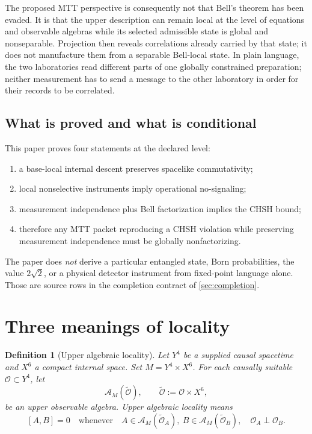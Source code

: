 \documentclass[11pt]{article}
\newcommand{\cA}{\mathcal{A}}
\newtheorem{definition}[theorem]{Definition}
\theoremstyle{remark}
\begin{document}
The proposed MTT perspective is consequently not that Bell's theorem has been
evaded.  It is that the upper description can remain local at the level of
equations and observable algebras while its selected admissible state is
global and nonseparable.  Projection then reveals correlations already carried
by that state; it does not manufacture them from a separable Bell-local state.
In plain language, the two laboratories read different parts of one globally
constrained preparation; neither measurement has to send a message to the
other laboratory in order for their records to be correlated.

\subsection{What is proved and what is conditional}

This paper proves four statements at the declared level:

\begin{enumerate}[label=(\arabic*)]
\item a base-local internal descent preserves spacelike commutativity;
\item local nonselective instruments imply operational no-signaling;
\item measurement independence plus Bell factorization implies the CHSH
bound;
\item therefore any MTT packet reproducing a CHSH violation while preserving
measurement independence must be globally nonfactorizing.
\end{enumerate}

The paper does \emph{not} derive a particular entangled state, Born
probabilities, the value $2\sqrt{2}$, or a physical detector instrument from
fixed-point language alone.  Those are source rows in the completion contract
of \cref{sec:completion}.

\section{Three meanings of locality}
\label{sec:localities}

\begin{definition}[Upper algebraic locality]
Let $Y^4$ be a supplied causal spacetime and $X^6$ a compact internal
space.  Set $M=Y^4\times X^6$.  For each causally suitable
$\mathcal O\subset Y^4$, let
\[
  \cA_M(\widetilde{\mathcal O}),
  \qquad
  \widetilde{\mathcal O}:=\mathcal O\times X^6,
\]
be an upper observable algebra.  Upper algebraic locality means
\[
 [A,B]=0
 \quad\text{whenever}\quad
 A\in\cA_M(\widetilde{\mathcal O}_A),\
 B\in\cA_M(\widetilde{\mathcal O}_B),
 \quad
 \mathcal O_A\perp\mathcal O_B .
\]
\end{definition}
\end{document}
